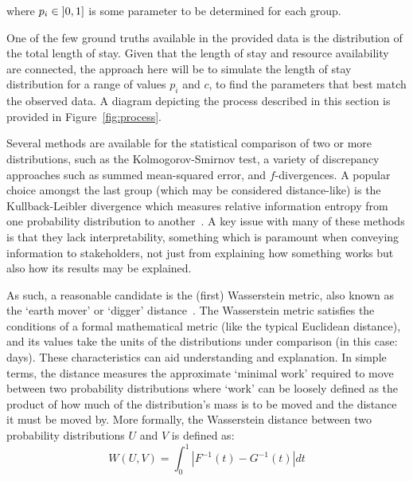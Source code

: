 \documentclass[11pt]{article}
\begin{document}
\noindent where \(p_i \in \interval[open left]{0}{1}\) is some parameter to be
determined for each group.

One of the few ground truths available in the provided data is the distribution
of the total length of stay. Given that the length of stay and resource
availability are connected, the approach here will be to simulate the length of
stay distribution for a range of values \(p_i\) and \(c\), to find the
parameters that best match the observed data. A diagram depicting the process
described in this section is provided in Figure~\ref{fig:process}.

Several methods are available for the statistical comparison of two or more
distributions, such as the Kolmogorov-Smirnov test, a variety of discrepancy
approaches such as summed mean-squared error, and \(f\)-divergences.  A popular
choice amongst the last group (which may be considered distance-like) is the
Kullback-Leibler divergence which measures relative information entropy from one
probability distribution to another~\cite{Kullback1951}. A key issue with many
of these methods is that they lack interpretability, something which is
paramount when conveying information to stakeholders, not just from explaining
how something works but also how its results may be explained.

As such, a reasonable candidate is the (first) Wasserstein metric, also known as
the `earth mover' or `digger' distance~\cite{Vaserstein1969}. The Wasserstein
metric satisfies the conditions of a formal mathematical metric (like the
typical Euclidean distance), and its values take the units of the distributions
under comparison (in this case: days). These characteristics can aid
understanding and explanation. In simple terms, the distance measures the
approximate `minimal work' required to move between two probability
distributions where `work' can be loosely defined as the product of how much of
the distribution's mass is to be moved and the distance it must be moved by.
More formally, the Wasserstein distance between two probability distributions
\(U\) and \(V\) is defined as:
\begin{equation}\label{eq:wasserstein}
    W(U, V) = \int_{0}^{1} \left\vert F^{-1}(t) - G^{-1}(t) \right\vert dt
\end{equation}
\end{document}
